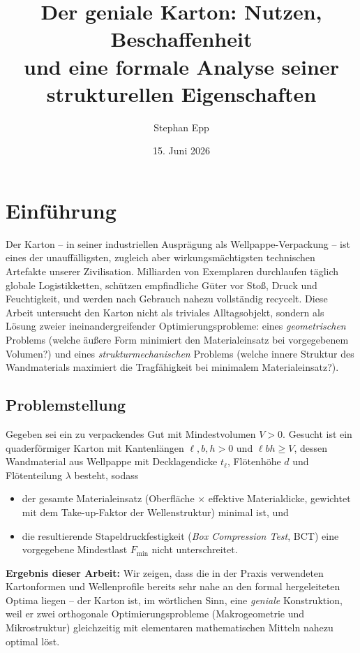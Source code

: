 ﻿\documentclass[a4paper,12pt]{article}
\title{Der geniale Karton: Nutzen, Beschaffenheit\\ und eine formale Analyse seiner strukturellen Eigenschaften}
\author{Stephan Epp}
\date{15. Juni 2026}
\theoremstyle{definition}
\begin{document}
\maketitle

\tableofcontents
\newpage

\section{Einführung}

Der Karton -- in seiner industriellen Ausprägung als Wellpappe-Verpackung -- ist eines der
unauffälligsten, zugleich aber wirkungsmächtigsten technischen Artefakte unserer
Zivilisation. Milliarden von Exemplaren durchlaufen täglich globale Logistikketten,
schützen empfindliche Güter vor Stoß, Druck und Feuchtigkeit, und werden nach Gebrauch
nahezu vollständig recycelt. Diese Arbeit untersucht den Karton nicht als triviales
Alltagsobjekt, sondern als Lösung zweier ineinandergreifender Optimierungsprobleme:
eines \emph{geometrischen} Problems (welche äußere Form minimiert den Materialeinsatz
bei vorgegebenem Volumen?) und eines \emph{strukturmechanischen} Problems (welche
innere Struktur des Wandmaterials maximiert die Tragfähigkeit bei minimalem
Materialeinsatz?).

\subsection{Problemstellung}

Gegeben sei ein zu verpackendes Gut mit Mindestvolumen $V > 0$. Gesucht ist ein
quaderförmiger Karton mit Kantenlängen $\ell, b, h > 0$ und $\ell b h \geq V$, dessen
Wandmaterial aus Wellpappe mit Decklagendicke $t_\ell$, Flötenhöhe $d$ und Flötenteilung
$\lambda$ besteht, sodass

\begin{itemize}
	\item der gesamte Materialeinsatz (Oberfläche $\times$ effektive Materialdicke,
	      gewichtet mit dem Take-up-Faktor der Wellenstruktur) minimal ist, und
	\item die resultierende Stapeldruckfestigkeit (\emph{Box Compression Test},
	      BCT) eine vorgegebene Mindestlast $F_{\min}$ nicht unterschreitet.
\end{itemize}

\textbf{Ergebnis dieser Arbeit:} Wir zeigen, dass die in der Praxis verwendeten
Kartonformen und Wellenprofile bereits sehr nahe an den formal hergeleiteten Optima
liegen -- der Karton ist, im wörtlichen Sinn, eine \emph{geniale} Konstruktion, weil er
zwei orthogonale Optimierungsprobleme (Makrogeometrie und Mikrostruktur) gleichzeitig
mit elementaren mathematischen Mitteln nahezu optimal löst.
\end{document}
